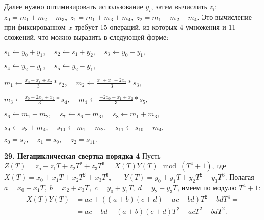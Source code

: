 \documentclass{../../template/mai_book}
\begin{document}
Далее нужно оптимизировать использование $y_i$, затем вычислить \newline $z_i$: $z_0 = m_1 + m_2 - m_3, \; z_1 = m_1 + m_3 + m_4, \; z_2 = m_1 - m_2 - m_4$. Это вычисление при фиксированном $x$ требует 15 операций, из которых 4 умножения и 11 сложений, что можно выразить в следующей форме:
\begin{center}
$
s_1 \leftarrow y_0 + y_1, \; \;\; \; s_2 \leftarrow s_1 + y_2, \; \;\; \; s_3 \leftarrow y_0 - y_1,
$
\end{center}
\begin{center}
$s_4 \leftarrow y_2 - y_0 , \; \;\; \; s_5 \leftarrow y_2 - y_1 ,$
\end{center}
\begin{center}
$m_1 \leftarrow \frac{x_0 + x_1 + x_2}{3} * s_2, \; \;\; \; m_2 \leftarrow \frac{x_0 + x_1 - 2x_2}{3} * s_3,$
\end{center}
\begin{center}
$m_3 \leftarrow \frac{x_0 - 2x_1 + x_2}{3} * s_4, \; \;\; \; m_4 \leftarrow \frac{-2x_0 + x_1 + x_2}{3} * s_5,$
\end{center}
\begin{center}
$s_6 \leftarrow m_1 + m_2, \; \;\; \; s_7 \leftarrow s_6 - m_3, \; \;\; \; s_8 \leftarrow m_1 + m_3,$
\end{center}
\begin{center}
$s_9 \leftarrow s_8 + m_4, \; \;\; \; s_{10} \leftarrow m_1 - m_2, \; \;\; \; s_{11} \leftarrow s_{10} - m_4,$ 
\end{center}
\begin{center}
$z_0 = s_7, \; \;\; \; z_1 = s_9, \; \;\; \; z_2 = s_{11}.$
\end{center}
\newpage
\noindent
\textbf{29. Негациклическая свертка порядка 4} \newline \newline
\indent Пусть $Z(T) = z_o + z_1 T + z_2 T^2 + z_3 T^3 = X(T)Y(T) \mod (T^4 + 1)$, где \newline \newline \indent $X(T) = x_0 + x_1 T + x_2 T^2 + x_3 T^3, \; \; \; \; \; \; Y(T) = y_0 + y_1 T + y_2 T^2 + y_3 T^3$. \newline
\newline
Полагая $a = x_0 + x_1 T, \; b = x_2 + x_3 T, \; c = y_0 + y_1 T, \; d = y_2 + y_3 T$, имеем по модулю $T^4 + 1:$ 
\begin{align*}
X(T)Y(T) &= ac + ((a + b)(c + d) - ac - bd)T^2 + bdT^4 = \\
&= ac - bd + (a + b)(c + d)T^2 - acT^2 - bdT^2.
\end{align*}
\end{document}
